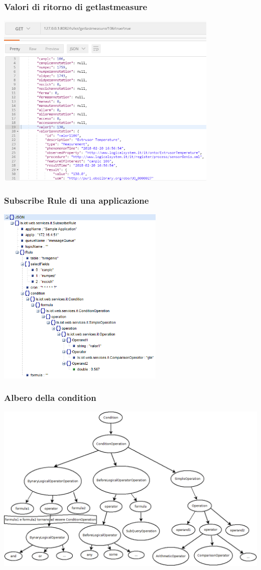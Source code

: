 \documentclass{beamer}
\begin{document}
\begin{frame}
\frametitle{Valori di ritorno di getlastmeasure}
\includegraphics[width=0.8\textwidth]{images/Postman1-corretto.png}
\end{frame}

\begin{frame}
\frametitle{Subscribe Rule di una applicazione}
\includegraphics[width=0.6\textwidth]{images/subscribe-json-1.png}
\end{frame}

\begin{frame}
\frametitle{Albero della condition}
\includegraphics[width=1\textwidth]{images/strutturaquerytree.png}
\end{frame}
\end{document}

